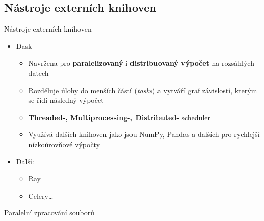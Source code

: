 \documentclass{beamer}
\begin{document}
\subsection{Nástroje externích knihoven}
\begin{frame}{Nástroje externích knihoven}
	\begin{itemize}
    \item Dask
      \begin{itemize}
        \item [\textendash] Navržena pro \textbf{paralelizovaný} i \textbf{distribuovaný výpočet} na rozsáhlých datech

        \item [\textendash] Rozděluje úlohy do menších částí (\textit{tasks}) a vytváří graf závislostí, kterým se řídí následný výpočet

        \item [\textendash] \textbf{Threaded-, Multiprocessing-, Distributed-} scheduler

        \item [\textendash] Využívá dalších knihoven jako jsou NumPy, Pandas a dalších pro rychlejší nízkoúrovňové výpočty
      \end{itemize}
    \item Další:
      \begin{itemize}
        \item [\textendash] Ray
        \item [\textendash] Celery\dots
      \end{itemize}
  \end{itemize}
\end{frame}

\begin{frame}{Paralelní zpracování souborů}



    \begin{center}

    \end{center}
\end{frame}
\end{document}
